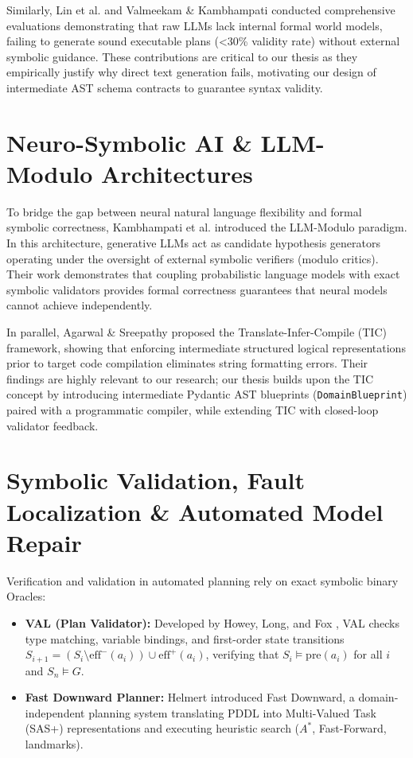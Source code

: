 \documentclass[11pt,a4paper]{report}
\begin{document}
Similarly, Lin et al. \cite{lin2023} and Valmeekam \& Kambhampati \cite{valmeekam2023} conducted comprehensive evaluations demonstrating that raw LLMs lack internal formal world models, failing to generate sound executable plans (<30\% validity rate) without external symbolic guidance. These contributions are critical to our thesis as they empirically justify why direct text generation fails, motivating our design of intermediate AST schema contracts to guarantee syntax validity.

\section{Neuro-Symbolic AI \& LLM-Modulo Architectures}
To bridge the gap between neural natural language flexibility and formal symbolic correctness, Kambhampati et al. \cite{kambhampati2024} introduced the LLM-Modulo paradigm. In this architecture, generative LLMs act as candidate hypothesis generators operating under the oversight of external symbolic verifiers (modulo critics). Their work demonstrates that coupling probabilistic language models with exact symbolic validators provides formal correctness guarantees that neural models cannot achieve independently.

In parallel, Agarwal \& Sreepathy \cite{agarwal2024} proposed the Translate-Infer-Compile (TIC) framework, showing that enforcing intermediate structured logical representations prior to target code compilation eliminates string formatting errors. Their findings are highly relevant to our research; our thesis builds upon the TIC concept by introducing intermediate Pydantic AST blueprints (\texttt{DomainBlueprint}) paired with a programmatic compiler, while extending TIC with closed-loop validator feedback.

\section{Symbolic Validation, Fault Localization \& Automated Model Repair}
Verification and validation in automated planning rely on exact symbolic binary Oracles:
\begin{itemize}
    \item \textbf{VAL (Plan Validator):} Developed by Howey, Long, and Fox \cite{howey2004}, VAL checks type matching, variable bindings, and first-order state transitions $S_{i+1} = (S_i \setminus \text{eff}^-(a_i)) \cup \text{eff}^+(a_i)$, verifying that $S_i \models \text{pre}(a_i)$ for all $i$ and $S_n \models G$.
    \item \textbf{Fast Downward Planner:} Helmert \cite{helmert2006} introduced Fast Downward, a domain-independent planning system translating PDDL into Multi-Valued Task (SAS+) representations and executing heuristic search ($A^*$, Fast-Forward, landmarks).
\end{itemize}
\end{document}
